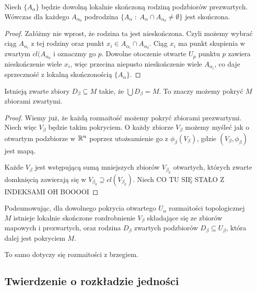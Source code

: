 \begin{remark}
Niech $\{A_\alpha\}$ będzie dowolną lokalnie skończoną rodziną podzbiorów prezwartych. Wówczas dla każdego $A_{\alpha_0}$ podrodzina $\{A_\alpha\;:\;A_\alpha\cap A_{\alpha_0}\neq\emptyset\}$ jest skończona.
\end{remark}
\begin{proof}
Załóżmy nie wprost, że rodzina ta jest nieskończona. Czyli możemy wybrać ciąg $A_{\alpha_i}$ z tej rodziny oraz punkt $x_i\in A_{\alpha_i}\cap A_{\alpha_0}$. 
Ciąg $x_i$ ma punkt skupienia w zwartym $cl(A_{\alpha_0}$ i oznaczmy go $p$. Dowolne otoczenie otwarte $U_p$ punktu $p$ zawiera nieskończenie wiele $x_i$, więc przecina niepusto nieskończenie wiele $A_{\alpha_i}$, co daje sprzeczność z lokalną skończonością $\{A_\alpha\}$.
\end{proof}

\begin{remark}
Istnieją zwarte zbiory $D_\beta\subseteq M$ takie, że $\bigcup D_\beta=M$. To znaczy możemy pokryć $M$ zbiorami zwartymi.
\end{remark}
\begin{proof}
Wiemy już, że każdą rozmaitość możemy pokryć zbiorami prezwartymi. Niech więc $V_\beta$ będzie takim pokryciem. O każdy zbiorze $V_\beta$ możemy myśleć jak o otwartym podzbiorze w $\mathbb{R}^n$ poprzez utożsamienie go z $\phi_\beta(V_\beta)$, gdzie $(V_\beta,\phi_\beta)$ jest mapą.

Każde $V_\beta$ jest wstępującą sumą mniejszych zbiorów $V_{\beta_k}$ otwartych, których zwarte domknięcią zawierają się w $V_{\beta_0}\supseteq cl(V_{\beta_k})$. Niech {\large\color{orange}CO TU SIĘ STAŁO Z INDEKSAMI OH BOOOOI}
\end{proof}

\begin{bbox}
Podsumowując, dla dowolnego pokrycia otwartego $U_\alpha$ rozmaitości topologicznej $M$ istnieje lokalnie skończone rozdrobnienie $V_\beta$ składające się ze zbiorów mapowych i prezwartych, oraz rodzina $D_\beta$ zwartych podzbiorów $D_\beta\subseteq U_\beta$, która dalej jest pokryciem $M$.

To samo dotyczy się rozmaitości z brzegiem.
\end{bbox}


\subsection{Twierdzenie o rozkładzie jedności}

